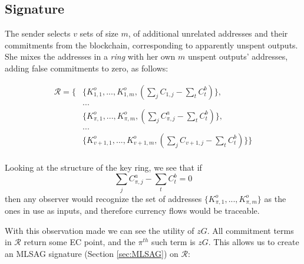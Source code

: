 \subsection{Signature}
\label{full-signature}



The sender selects $v$ sets of size $m$, of additional unrelated addresses and their commitments from the blockchain, corresponding to apparently unspent outputs. She mixes the addresses in a {\em ring} with her own $m$ unspent outputs' addresses, adding false commitments to zero, as follows:

\begin{align*}
  \mathcal{R} = \{ &\{K_{1,1}^o,...,K_{1,m}^o, (\sum\limits_j C_{1, j} - \sum\limits_t C^b_{t})\}, \\
  &... \\
  &\{K_{\pi,1}^o,...,K_{\pi,m}^o, (\sum\limits_j C^a_{\pi, j} - \sum\limits_t C^b_{t})\}, \\
  &... \\
  &\{K_{v+1,1}^o,...,K_{v+1,m}^o, (\sum\limits_j C_{v+1, j} - \sum\limits_t C^b_{t})\}\}
\end{align*}
\\

Looking at the structure of the key ring, we see that if  \[\sum\limits_j C^a_{\pi, j} -\sum\limits_t C^b_{t} = 0\] then any observer would recognize the set of addresses
$\{K_{\pi,1}^o,...,K_{\pi,m}^o\}$
as the ones in use as inputs, and therefore currency flows would be traceable.

With this observation made we can see the utility of $z G$. All commitment terms in $\mathcal{R}$ return some EC point, and the $\pi^{th}$ such term is $z G$. This allows us to create an MLSAG signature (Section \ref{sec:MLSAG}) on $\mathcal{R}$:


